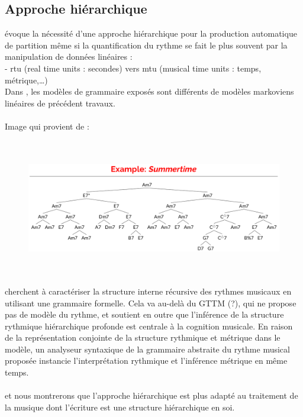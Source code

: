 \subsection*{Approche hiérarchique}
\cite{foscarin:hal-01988990} évoque la nécessité d’une approche hiérarchique pour la production automatique de partition même si la quantification du rythme se fait le plus souvent par la manipulation de données linéaires :\\
- rtu (real time units : secondes) vers mtu (musical time units : temps, métrique,…)\\
Dans \cite{foscarin:hal-01988990}, les modèles de grammaire exposés sont différents de modèles markoviens linéaires de précédent travaux.\\\\
Image qui provient de \cite{harasimjazz} :\\
\begin{figure}[h]
	\centering
	\includegraphics[height=60mm, width=125mm]{z_images/2_etat_de_l_art/summertime_tree.png}
\end{figure}

\cite{rohrmeier2020towards} cherchent à caractériser la structure interne récursive des rythmes musicaux en utilisant une grammaire formelle.
Cela va au-delà du GTTM (?), qui ne propose pas de modèle du rythme, et soutient en outre que l'inférence de la structure rythmique hiérarchique profonde est centrale à la cognition musicale. En raison de la représentation conjointe de la structure rythmique et métrique dans le modèle, un analyseur syntaxique de la grammaire abstraite du rythme musical proposée instancie l'interprétation rythmique et l'inférence métrique en même temps.\\\\
et nous montrerons que l’approche hiérarchique est plus adapté au traitement de la musique dont l’écriture est une structure hiérarchique en soi.
